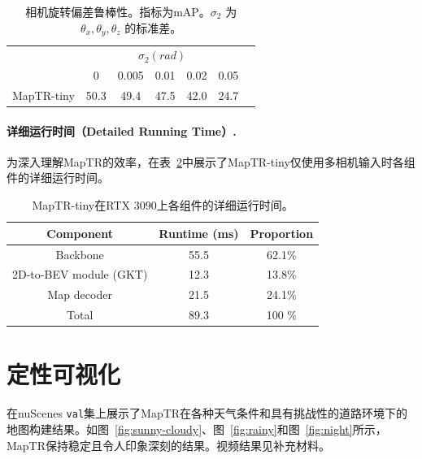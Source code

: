 \documentclass{article} %
\begin{document}
\begin{table}[t!]
\begin{center}
\begin{tabular}{l|cccccc}
\hline
\rowcolor{Gray}
 &  \multicolumn{5}{c}{  $\sigma_2 (rad)$} \\
\rowcolor{Gray}
\multirow{-2}{*}{Method} & 0 &  0.005 &  0.01 &  0.02 &  0.05   \\
\toprule
MapTR-tiny & \cellcolor{blue!10}50.3& 49.4& 47.5 & 42.0 & 24.7\\
\bottomrule
\end{tabular}
\end{center}
\vspace*{-0.45cm}
\caption{相机旋转偏差鲁棒性。指标为mAP。$\sigma_2$ 为 $\theta_x, \theta_y, \theta_z$ 的标准差。}
\label{tab:rot}
\vspace*{-0.35cm}
\end{table}

\paragraph{详细运行时间（Detailed Running Time）.} 为深入理解MapTR的效率，在表~\ref{tab:runtime}中展示了MapTR-tiny仅使用多相机输入时各组件的详细运行时间。

\begin{table}[ht!]
\begin{center}
\begin{tabular}{ccc}
\hline
\rowcolor{Gray}
Component & Runtime (ms) & Proportion \\
\toprule
Backbone & 55.5 & 62.1\%\\
2D-to-BEV module (GKT) & 12.3 & 13.8\%\\
Map decoder & 21.5 & 24.1\% \\
\hline
Total& 89.3 & 100 \%\\
\bottomrule
\end{tabular}
\end{center}
\vspace*{-0.45cm}
\caption{MapTR-tiny在RTX 3090上各组件的详细运行时间。}
\label{tab:runtime}
\vspace*{-0.35cm}
\end{table}
\section{定性可视化}
\label{sec:more_vis}
在nuScenes \texttt{val}集上展示了MapTR在各种天气条件和具有挑战性的道路环境下的地图构建结果。如图~\ref{fig:sunny-cloudy}、图~\ref{fig:rainy}和图~\ref{fig:night}所示，MapTR保持稳定且令人印象深刻的结果。视频结果见补充材料。
\end{document}
